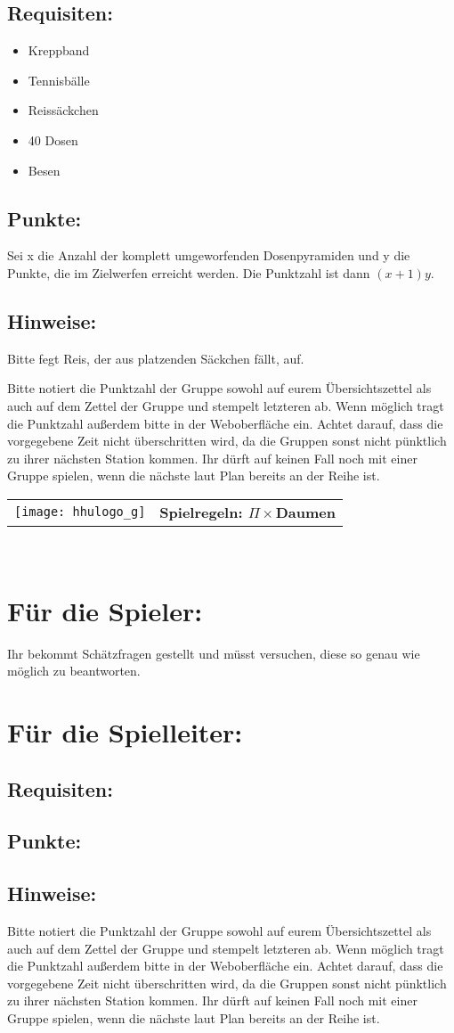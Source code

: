 \documentclass[a4paper,10pt]{article}
\def\spieli{$\Pi\times $Daumen}
\newcommand{\unten}{
 Bitte notiert die Punktzahl der Gruppe sowohl auf eurem Übersichtszettel als auch auf dem Zettel der Gruppe und stempelt letzteren ab. Wenn möglich tragt die Punktzahl außerdem bitte in der Weboberfläche ein.
 Achtet darauf, dass die vorgegebene Zeit nicht überschritten wird, da die Gruppen sonst nicht pünktlich zu ihrer nächsten Station kommen. Ihr dürft auf keinen Fall noch mit einer Gruppe spielen, wenn die nächste laut Plan bereits an der Reihe ist.
}
\begin{document}
\subsection*{Requisiten:} 
\begin{itemize}
 \item Kreppband
 \item Tennisbälle
 \item Reissäckchen
 \item 40 Dosen
 \item Besen
\end{itemize}

\subsection*{Punkte:}
Sei x die Anzahl der komplett umgeworfenden Dosenpyramiden und y die Punkte, die im Zielwerfen erreicht werden. Die Punktzahl ist dann $(x+1)y$. 
\subsection*{Hinweise:}
Bitte fegt Reis, der aus platzenden Säckchen fällt, auf.
\unten

\newpage

  \begin{tabularx}{\textwidth}{lc}
    \texttt{[image: hhulogo\_g]}
  & {\Huge \textbf{Spielregeln: \spieli}}
  \end{tabularx}\\


\Large
\section*{Für die Spieler:}
Ihr bekommt Schätzfragen gestellt und müsst versuchen, diese so genau wie möglich
zu beantworten. 

\section*{Für die Spielleiter:}
\subsection*{Requisiten:} 
\subsection*{Punkte:}
\subsection*{Hinweise:}
\unten

\newpage
\end{document}
